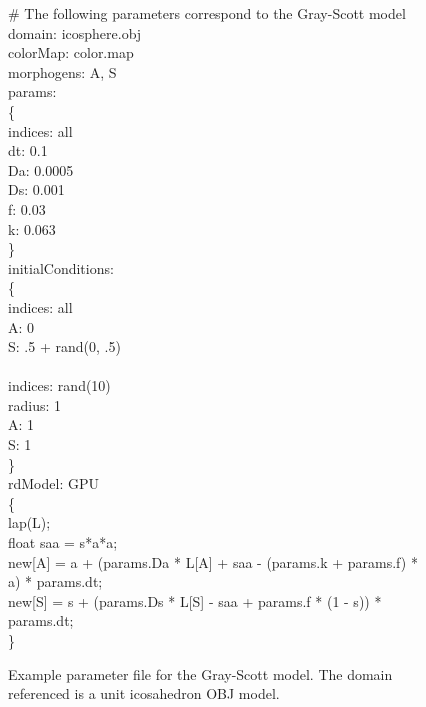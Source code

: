 \begin{figure}[p]
\LinesNotNumbered
\begin{algorithm}[H]
	\# The following parameters correspond to the Gray-Scott model \\	
	domain: icosphere.obj \\
	colorMap: color.map \\
	morphogens: A, S\\
	
	params:\\
	\{\\
\quad indices: all\\
\quad dt: 0.1\\
\quad Da: 0.0005\\
\quad Ds: 0.001\\
\quad f: 0.03\\
\quad k: 0.063\\
	\}\\
	initialConditions:\\
	\{\\
\quad indices: all\\
\quad A: 0\\
\quad S: .5 + rand(0, .5)\\
\quad \\
\quad indices: rand(10)\\
\quad radius: 1\\
\quad A: 1\\
\quad S: 1\\
	\}\\
	rdModel: GPU\\
	\{\\
\quad lap(L);\\
\quad float saa = s*a*a;\\
\quad new[A] = a + (params.Da * L[A] + saa - (params.k + params.f) * a) * params.dt;\\
\quad new[S] = s + (params.Ds * L[S] - saa + params.f * (1 - s)) * params.dt;\\
	\}
\end{algorithm}
	\caption{Example parameter file for the Gray-Scott model. The domain referenced is a unit icosahedron OBJ model.}
	\label{fig:paramFileExample}
\end{figure}

